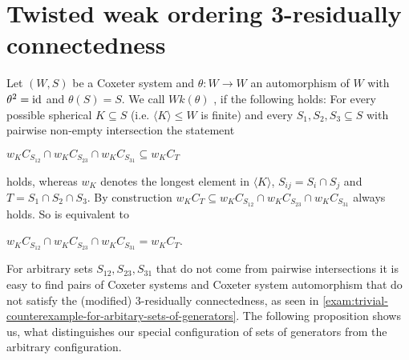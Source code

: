 \chapter{Twisted weak ordering 3-residually connectedness}
\label{sec:main-thesis}

\begin{defi}
	Let $(W,S)$ be a Coxeter system and $\theta : W \to W$ an automorphism of $W$ with $\theta^2 = \operatorname{id}$ and $\theta(S) = S$. We call $Wk(\theta)$ , if the following holds: For every possible spherical $K \subseteq S$ (i.e. $\langle K \rangle \leq W$ is finite) and every $S_1,S_2,S_3 \subseteq S$ with pairwise non-empty intersection the statement
	\begin{axioms}
		 $w_K C_{S_{12}} \cap w_K C_{S_{23}} \cap w_K C_{S_{31}} \subseteq w_K C_T$
	\end{axioms}
	holds, whereas $w_K$ denotes the longest element in $\langle K \rangle$, $S_{ij} = S_i \cap S_j$ and $T = S_1 \cap S_2 \cap S_3$. By construction $w_K C_T \subseteq w_K C_{S_{12}} \cap w_K C_{S_{23}} \cap w_K C_{S_{31}}$ always holds. So  is equivalent to
	\begin{axioms}
		 $w_K C_{S_{12}} \cap w_K C_{S_{23}} \cap w_K C_{S_{31}} = w_K C_T$.
	\end{axioms}
\end{defi}

For arbitrary sets $S_{12},S_{23},S_{31}$ that do not come from pairwise intersections it is easy to find pairs of Coxeter systems and Coxeter system automorphism that do not satisfy the (modified) 3-residually connectedness, as seen in \ref{exam:trivial-counterexample-for-arbitary-sets-of-generators}. The following proposition shows us, what distinguishes our special configuration of sets of generators from the arbitrary configuration.

